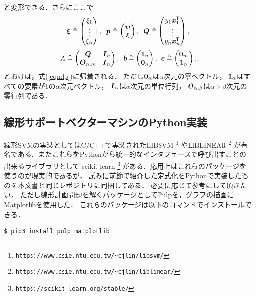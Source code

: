 と変形できる．さらにここで
\begin{equation}
    \boldsymbol{\xi} \triangleq
    \begin{pmatrix}
        \xi_1  \\ \vdots \\ \xi_n
    \end{pmatrix},
    \hspace{5pt}
    \boldsymbol{p} \triangleq
    \begin{pmatrix}
        \boldsymbol{w} \\ \boldsymbol{\xi}
    \end{pmatrix},
    \hspace{5pt}
    \boldsymbol{Q} \triangleq
    \begin{pmatrix}
        y_1 \boldsymbol{x}_1^{\mkern-1.5mu\mathsf{T}} \\
        \vdots            \\
        y_n \boldsymbol{x}_n^{\mkern-1.5mu\mathsf{T}} \\
    \end{pmatrix},
\end{equation}
\begin{equation}
    \boldsymbol{A} \triangleq
    \begin{pmatrix}
        \boldsymbol{Q}        & \boldsymbol{I}_n \\
        \boldsymbol{O}_{n, m} & \boldsymbol{I}_n
    \end{pmatrix},
    \hspace{5pt}
    \boldsymbol{b} \triangleq
    \begin{pmatrix}
        \boldsymbol{1}_n \\ \boldsymbol{0}_n
    \end{pmatrix},
    \hspace{5pt}
    \boldsymbol{c} \triangleq
    \begin{pmatrix}
        \boldsymbol{0}_m \\ \boldsymbol{1}_n
    \end{pmatrix},
\end{equation}
とおけば，式(\ref{eqn:lp})に帰着される．
ただし$\boldsymbol{0}_\alpha$は$\alpha$次元の零ベクトル，
$\boldsymbol{1}_\alpha$はすべての要素が1の$\alpha$次元ベクトル，
$\boldsymbol{I}_\alpha$は$\alpha$次元の単位行列，
$\boldsymbol{O}_{\alpha, \beta}$は$\alpha \times \beta$次元の零行列である．


\subsection{線形サポートベクターマシンのPython実装}

線形SVMの実装としてはC/C++で実装されたLIBSVM
\footnote{\texttt{https://www.csie.ntu.edu.tw/\~{}cjlin/libsvm/}}
やLIBLINEAR
\footnote{\texttt{https://www.csie.ntu.edu.tw/\~{}cjlin/liblinear/}}
が有名である．またこれらをPythonから統一的なインタフェースで呼び出すことの出来るライブラリとして
scikit-learn
\footnote{\texttt{https://scikit-learn.org/stable/}}
がある．応用上はこれらのパッケージを使うのが現実的であるが，
試みに前節で紹介した定式化をPythonで実装したものを本文書と同じレポジトリに同梱してある．
必要に応じて参考にして頂きたい．
ただし線形計画問題を解くパッケージとしてPulpを，グラフの描画にMatplotlibを使用した．
これらのパッケージは以下のコマンドでインストールできる．

\begin{center}
\verb|$ pip3 install pulp matplotlib|
\end{center}


